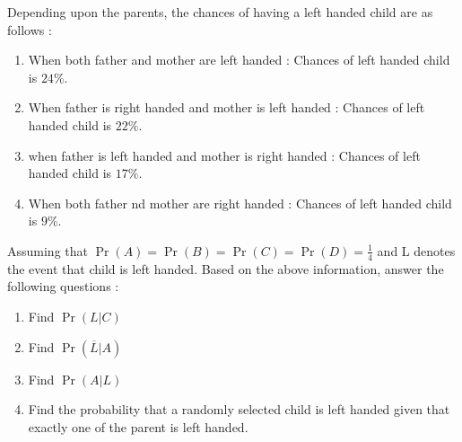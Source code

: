 \documentclass{article}
\providecommand{\pr}[1]{\ensuremath{\Pr\left(#1\right)}}
\begin{document}
\begin{enumerate}
Depending upon the parents, the chances of having a left handed child are as follows :\\
\begin{enumerate}
\item   When both father and mother are left handed :
        Chances of left handed child is $24\%$.
\item   When father is right handed and mother is left handed :
        Chances of left handed child is $22\%$.
\item   when father is left handed and mother is right handed :
        Chances of left handed child is $17\%$.
\item   When both father nd mother are right handed :
        Chances of left handed child is $9\%$.
\end{enumerate}
Assuming that $\pr{A}=\pr{B}=\pr{C}=\pr{D}=\frac{1}{4}$ and L denotes the event that child is left handed.
Based on the above information, answer the following questions :\\
\begin{enumerate}
	\item    Find \pr{L|C}
	\item    Find \pr{\overline{L}|A}
	\item    Find \pr{A|L}
\item    Find the probability that a randomly selected child is left handed given that exactly one of the parent is left handed.
\end{enumerate}
\end{enumerate}
\end{document}
